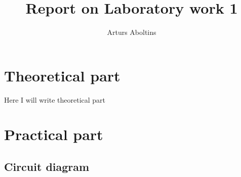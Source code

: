 \documentclass{report}
\title{Report on Laboratory work 1}
\author{Arturs Aboltins}
\begin{document}
\maketitle
\chapter{Theoretical part}
Here I will write theoretical part
\chapter{Practical part}
\section{Circuit diagram}
\end{document}
